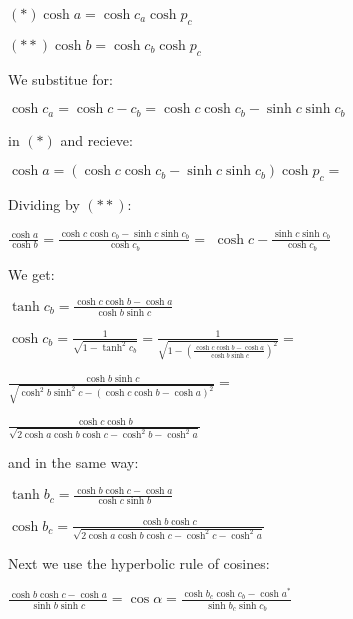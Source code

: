 \documentclass[a4paper,10pt]{article}
\begin{document}
\begin{center}
$ (*) \cosh{a} = \cosh{c_a}\cosh{p_c}$

$ (**) \cosh{b} = \cosh{c_b}\cosh{p_c}$
\end{center}

We substitue for:

\begin{center}
$ \cosh{c_a} = \cosh{c - c_b} = \cosh{c}\cosh{c_b} - \sinh{c}\sinh{c_b} $
\end{center}

in $(*)$ and recieve: 

\begin{center}
$\cosh{a} = \left(\cosh{c}\cosh{c_b} - \sinh{c}\sinh{c_b}\right)\cosh{p_c} =$


\end{center}


Dividing by $(**)$:

$\frac{\cosh{a}}{\cosh{b}} = \frac{\cosh{c}\cosh{c_b} - \sinh{c}\sinh{c_b}}{\cosh{c_b}} =$
$\cosh{c} - \frac{\sinh{c}\sinh{c_b}}{\cosh{c_b}} $

We get:

\begin{center}
$\tanh{c_b} = \frac{\cosh{c}\cosh{b} - \cosh{a}}{\cosh{b}\sinh{c}} $

$\cosh{c_b} = \frac{1}{\sqrt{1-\tanh^2{c_b}}} = \frac{1}{\sqrt{1 - \left(\frac{\cosh{c}\cosh{b} - \cosh{a}}{\cosh{b}\sinh{c}}\right)^2}} = $

$ \frac{\cosh{b}\sinh{c}}{\sqrt{\cosh^2{b}\sinh^2{c} - \left(\cosh{c}\cosh{b} - \cosh{a}\right)^2}} =$

$ \frac{\cosh{c}\cosh{b}}{\sqrt{2\cosh{a}\cosh{b}\cosh{c} - \cosh^2{b} - \cosh^2{a}}}$

\end{center}

and in the same way:
\begin{center}
$\tanh{b_c} = \frac{\cosh{b}\cosh{c} - \cosh{a}}{\cosh{c}\sinh{b}} $

$\cosh{b_c} = \frac{\cosh{b}\cosh{c}}{\sqrt{2\cosh{a}\cosh{b}\cosh{c} - \cosh^2{c} - \cosh^2{a}}}  $
\end{center}


Next we use the hyperbolic rule of cosines:

\begin{center}
$\frac{\cosh{b}\cosh{c} - \cosh{a}}{\sinh{b}\sinh{c}} = \cos{\alpha} = \frac{\cosh{b_c}\cosh{c_b} - \cosh{a^{*}}}{\sinh{b_c}\sinh{c_b}}$
\end{center}
\end{document}
